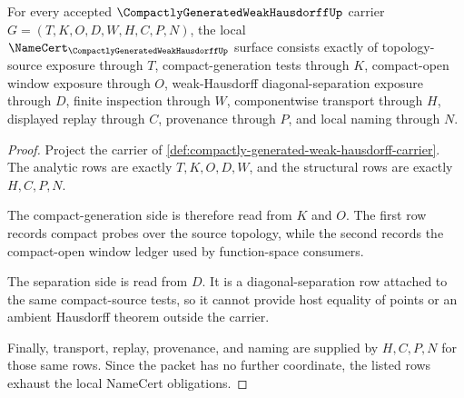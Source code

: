 \begin{theorem}
\label{thm:compactly-generated-weak-hausdorff-namecert-obligations}
For every accepted $\CompactlyGeneratedWeakHausdorffUp$ carrier $G=(T,K,O,D,W,H,C,P,N)$, the local $\NameCert_{\CompactlyGeneratedWeakHausdorffUp}$ surface consists exactly of topology-source exposure through $T$, compact-generation tests through $K$, compact-open window exposure through $O$, weak-Hausdorff diagonal-separation exposure through $D$, finite inspection through $W$, componentwise transport through $H$, displayed replay through $C$, provenance through $P$, and local naming through $N$.
\end{theorem}
\begin{proof}
Project the carrier of \autoref{def:compactly-generated-weak-hausdorff-carrier}. The analytic rows are exactly $T,K,O,D,W$, and the structural rows are exactly $H,C,P,N$.

The compact-generation side is therefore read from $K$ and $O$. The first row records compact probes over the source topology, while the second records the compact-open window ledger used by function-space consumers.

The separation side is read from $D$. It is a diagonal-separation row attached to the same compact-source tests, so it cannot provide host equality of points or an ambient Hausdorff theorem outside the carrier.

Finally, transport, replay, provenance, and naming are supplied by $H,C,P,N$ for those same rows. Since the packet has no further coordinate, the listed rows exhaust the local NameCert obligations.
\end{proof}


